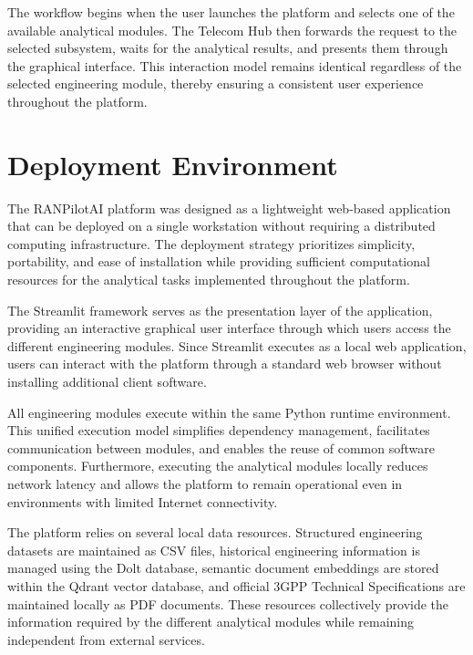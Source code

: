 The workflow begins when the user launches the platform and selects one of the available analytical modules. The Telecom Hub then forwards the request to the selected subsystem, waits for the analytical results, and presents them through the graphical interface. This interaction model remains identical regardless of the selected engineering module, thereby ensuring a consistent user experience throughout the platform.


\section{Deployment Environment}

The RANPilotAI platform was designed as a lightweight web-based application that can be deployed on a single workstation without requiring a distributed computing infrastructure. The deployment strategy prioritizes simplicity, portability, and ease of installation while providing sufficient computational resources for the analytical tasks implemented throughout the platform.

The Streamlit framework serves as the presentation layer of the application, providing an interactive graphical user interface through which users access the different engineering modules. Since Streamlit executes as a local web application, users can interact with the platform through a standard web browser without installing additional client software.

All engineering modules execute within the same Python runtime environment. This unified execution model simplifies dependency management, facilitates communication between modules, and enables the reuse of common software components. Furthermore, executing the analytical modules locally reduces network latency and allows the platform to remain operational even in environments with limited Internet connectivity.

The platform relies on several local data resources. Structured engineering datasets are maintained as CSV files, historical engineering information is managed using the Dolt database, semantic document embeddings are stored within the Qdrant vector database, and official 3GPP Technical Specifications are maintained locally as PDF documents. These resources collectively provide the information required by the different analytical modules while remaining independent from external services.

